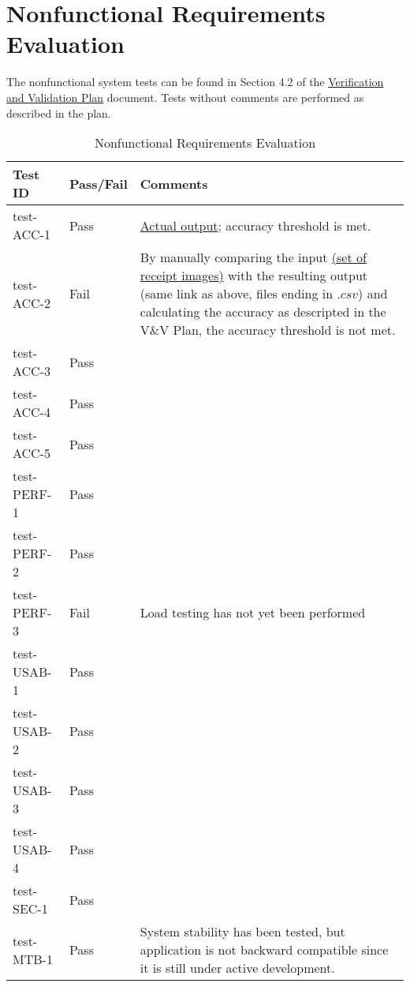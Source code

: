 \documentclass[12pt, titlepage]{article}
\begin{document}
\section{Nonfunctional Requirements Evaluation}

The nonfunctional system tests can be found in Section 4.2 of the
\href{https://github.com/PlutosCapstone/Plutos/blob/main/docs/VnVPlan/VnVPlan.pdf}{Verification
and Validation Plan} document. Tests without comments are performed as described
in the plan.


\begin{longtable}{>{\centering\arraybackslash}p{} >{\centering\arraybackslash}p{} >{\centering\arraybackslash}p{}}
  \caption{Nonfunctional Requirements Evaluation}\\
    \toprule
    \textbf{Test ID} & \textbf{Pass/Fail} & \textbf{Comments} \\
    \midrule
    test-ACC-1 & Pass &
    \href{https://github.com/PlutosCapstone/Plutos/tree/main/src/server/tests/imageProcessing/data/categorization/receipt_items_output.csv}{Actual
    output}; accuracy threshold is met. \\
    test-ACC-2 & Fail & By manually comparing the input
    \href{https://github.com/PlutosCapstone/Plutos/tree/main/src/server/tests/imageProcessing/data/parsing}{
    (set of receipt images)} with the resulting output (same link as above,
    files ending in $.csv$) and calculating the accuracy as descripted in the
    V\&V Plan, the accuracy threshold is not met. \\
    test-ACC-3 & Pass &  \\
    test-ACC-4 & Pass &  \\
    test-ACC-5 & Pass &  \\
    \midrule
    test-PERF-1 & Pass &  \\
    test-PERF-2 & Pass &  \\
    test-PERF-3 & Fail & Load testing has not yet been performed \\
    \midrule
    test-USAB-1 & Pass &  \\
    test-USAB-2 & Pass &  \\
    test-USAB-3 & Pass &  \\
    test-USAB-4 & Pass &  \\
    \midrule
    test-SEC-1 & Pass &  \\
    \midrule
    test-MTB-1 & Pass & System stability has been tested, but application is not
    backward compatible since it is still under active development. \\

\end{longtable}
\end{document}
